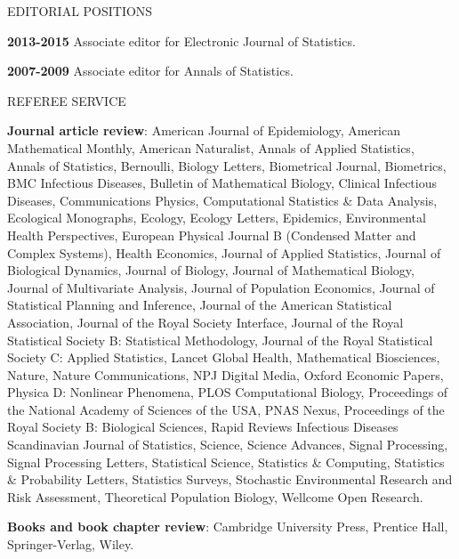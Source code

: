 \lsp
\begin{mylist}{EDITORIAL POSITIONS}
\item{\bf 2013-2015} Associate editor for Electronic Journal of Statistics.

\item{\bf 2007-2009} Associate editor for Annals of Statistics.

\end{mylist}

\lsp


\begin{mylist}{REFEREE SERVICE} %
\item {\bf Journal article review}: 
American Journal of Epidemiology,
American Mathematical Monthly,
American Naturalist,
Annals of Applied Statistics,
Annals of Statistics,
Bernoulli,
Biology Letters,
Biometrical Journal,
Biometrics,
BMC Infectious Diseases,
Bulletin of Mathematical Biology,
Clinical Infectious Diseases,
Communications Physics,
Computational Statistics \& Data Analysis,
Ecological Monographs,
Ecology,
Ecology Letters,
Epidemics,
Environmental Health Perspectives,
European Physical Journal B (Condensed Matter and Complex Systems),
Health Economics,
Journal of Applied Statistics,
Journal of Biological Dynamics,
Journal of Biology,
Journal of Mathematical Biology,
Journal of Multivariate Analysis,
Journal of Population Economics,
Journal of Statistical Planning and Inference,
Journal of the American Statistical Association, 
Journal of the Royal Society Interface,  
Journal of the Royal Statistical Society B: Statistical Methodology,
Journal of the Royal Statistical Society C: Applied Statistics,
Lancet Global Health,
Mathematical Biosciences,
Nature,
Nature Communications,
NPJ Digital Media,
Oxford Economic Papers,
Physica D: Nonlinear Phenomena,
PLOS Computational Biology,
Proceedings of the National Academy of Sciences of the USA,
PNAS Nexus,
Proceedings of the Royal Society B: Biological Sciences,
Rapid Reviews Infectious Diseases
Scandinavian Journal of Statistics,
Science,
Science Advances,
Signal Processing,
Signal Processing Letters,
Statistical Science,
Statistics \& Computing,
Statistics \& Probability Letters,
Statistics Surveys,
Stochastic Environmental Research and Risk Assessment,
Theoretical Population Biology,
Wellcome Open Research.

\item {\bf Books and book chapter review}:
Cambridge University Press, 
Prentice Hall,
 Springer-Verlag,  
 Wiley.


\end{mylist}
